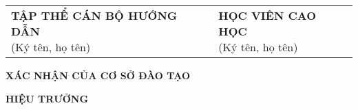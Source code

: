 \vspace{4\baselineskip}
\begin{table}[H]
\begin{adjustbox}{max width =\textwidth}
\begin{tabular}{p{8.44cm}p{8.4cm}}
\multicolumn{1}{p{8.44cm}}{
\centering \textbf{TẬP THỂ CÁN BỘ HƯỚNG DẪN} \newline
\centering
(Ký tên, họ tên) \newline
} &
\multicolumn{1}{p{8.4cm}}{
\centering \textbf{HỌC VIÊN CAO HỌC} \newline
\centering
(Ký tên, họ tên) \newline
} \\
\end{tabular}
\end{adjustbox}
\end{table}
\vspace{2\baselineskip}
\begin{center}
    \textbf{XÁC NHẬN CỦA CƠ SỞ ĐÀO TẠO}
\end{center}
\begin{center}
    \textbf{HIỆU TRƯỞNG}
\end{center}